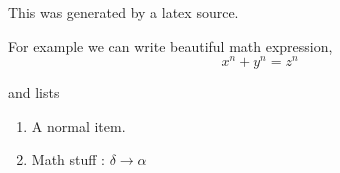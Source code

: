 \documentclass{article}
\begin{document}
This was generated by a latex source.

For example we can write beautiful math expression,
\[ x^n + y^n = z^n \]

and lists

\begin{enumerate}
    \item A normal item.
    \item Math stuff : $\delta \rightarrow \alpha$
\end{enumerate}
\end{document}
